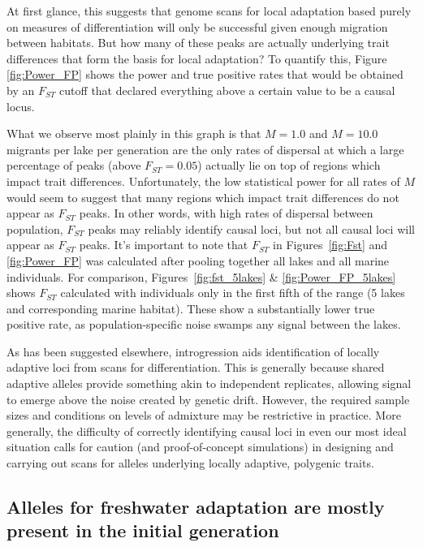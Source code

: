 \documentclass{article}
\newcommand{\plr}[1]{\todo[linecolor=blue,backgroundcolor=blue!25,bordercolor=blue]{#1}}
\begin{document}
At first glance, this suggests that genome scans for local adaptation based purely on measures of differentiation will only be successful given enough migration between habitats. 
But how many of these peaks are actually underlying trait differences that form the basis for local adaptation? 
To quantify this, Figure \ref{fig:Power_FP} shows the power and true positive rates that would be obtained by an $F_{ST}$ cutoff that declared everything above a certain value to be a causal locus. 

What we observe most plainly in this graph is that $M = 1.0$ and $M = 10.0$ migrants per lake per generation 
are the only rates of dispersal at which a large percentage of peaks (above $F_{ST} = 0.05$) 
actually lie on top of regions which impact trait differences.
Unfortunately, the low statistical power for all rates of $M$ would seem to suggest that many regions which impact trait differences do not appear as $F_{ST}$ peaks. 
In other words, with high rates of dispersal between population, $F_{ST}$ peaks may reliably identify causal loci, 
but not all causal loci will appear as $F_{ST}$ peaks.
It's important to note that $F_{ST}$ in Figures~\ref{fig:Fst} and \ref{fig:Power_FP} was calculated after pooling together all lakes and all marine individuals.
For comparison, Figures~\ref{fig:fst_5lakes} \& \ref{fig:Power_FP_5lakes} shows $F_{ST}$ calculated with individuals only in the first fifth of the range (5 lakes and corresponding marine habitat).
These show a substantially lower true positive rate, as population-specific noise swamps any signal between the lakes.

As has been suggested elsewhere, introgression aids identification of locally adaptive loci from scans for differentiation.
This is generally because shared adaptive alleles provide something akin to independent replicates,
allowing signal to emerge above the noise created by genetic drift.
However, the required sample sizes and conditions on levels of admixture may be restrictive in practice.
More generally, the difficulty of correctly identifying causal loci in even our most ideal situation
calls for caution (and proof-of-concept simulations) in designing and carrying out scans for alleles underlying locally adaptive, polygenic traits.

\subsection*{Alleles for freshwater adaptation are mostly present in the initial generation}
\end{document}
